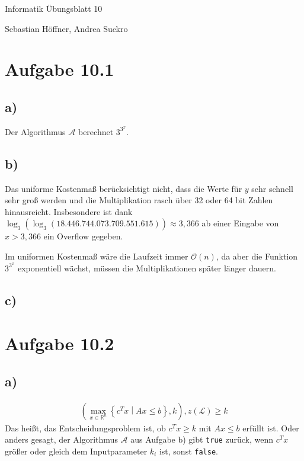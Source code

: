 \documentclass{article}
\begin{document}
\begin{center}
  \Large{Informatik \raisebox{0.05em}{:} Übungsblatt 10}

  \large{Sebastian Höffner, Andrea Suckro}
\end{center}



\section*{Aufgabe 10.1}
\subsection*{a)}
Der Algorithmus $\mathcal{A}$ berechnet $3^{3^x}$.


\subsection*{b)}
Das uniforme Kostenmaß berücksichtigt nicht, dass die Werte für $y$ sehr schnell sehr groß werden und die Multiplikation rasch über 32 oder 64 bit Zahlen hinausreicht.
Insbesondere ist dank $\log_3(\log_3(18.446.744.073.709.551.615)) \approx 3,366$ ab einer Eingabe von $x > 3,366$ ein Overflow gegeben.

Im uniformen Kostenmaß wäre die Laufzeit immer $\mathcal{O}(n)$, da aber die Funktion $3^{3^x}$ exponentiell wächst, müssen die Multiplikationen später länger dauern.


\subsection*{c)}




\section*{Aufgabe 10.2}

\subsection*{a)}
\begin{align*}
\left(\max\limits_{x\in\mathbb{R}^n}\left\{c^Tx\middle|Ax\leq b\right\}, k\right), z(\mathcal{L})\geq k
\end{align*}
Das heißt, das Entscheidungsproblem ist, ob $c^Tx \geq k$ mit $Ax \leq b$ erfüllt ist.
Oder anders gesagt, der Algorithmus $\mathcal{A}$ aus Aufgabe b) gibt \texttt{true} zurück, wenn $c^Tx$ größer oder gleich dem Inputparameter $k_i$ ist, sonst \texttt{false}.
\end{document}
